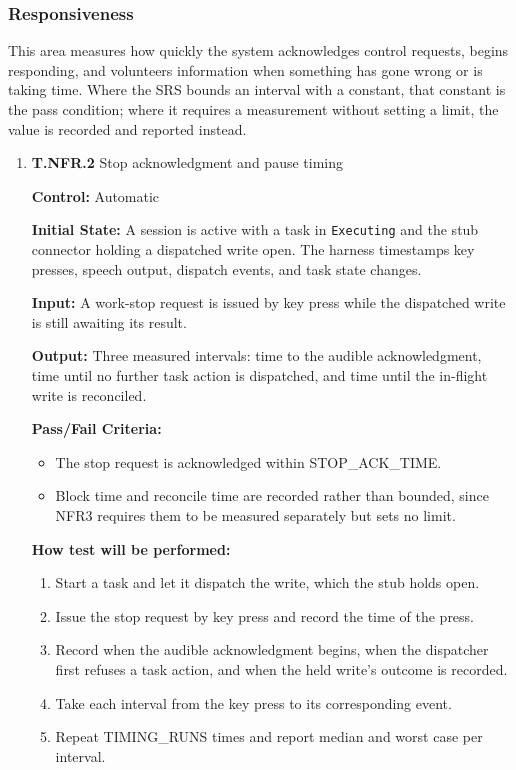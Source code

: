 \documentclass[12pt, titlepage]{article}
\begin{document}
\subsubsection{Responsiveness}

This area measures how quickly the system acknowledges control requests, begins responding, and volunteers
information when something has gone wrong or is taking time. Where the SRS bounds
an interval with a constant, that constant is the pass condition; where it requires a measurement without setting
a limit, the value is recorded and reported instead.

\begin{enumerate}


\item{\textbf{T.NFR.2} Stop acknowledgment and pause timing\\}\label{test:T.NFR.2}

\textbf{Control:} Automatic

\textbf{Initial State:} A session is active with a task in \texttt{Executing} and the stub connector holding a
dispatched write open. The harness timestamps key presses, speech output, dispatch events, and task state changes.

\textbf{Input:} A work-stop request is issued by key press while the dispatched write is still awaiting its result.

\textbf{Output:} Three measured intervals: time to the audible acknowledgment, time until no further
task action is dispatched, and time until the in-flight write is reconciled.

\textbf{Pass/Fail Criteria:}
\begin{itemize}
  \item The stop request is acknowledged within STOP\_ACK\_TIME.
  \item Block time and reconcile time are recorded rather than bounded, since NFR3 requires them to be measured separately but sets no limit.
\end{itemize}

\textbf{How test will be performed:}

\begin{enumerate}
  \item Start a task and let it dispatch the write, which the stub holds open.
  \item Issue the stop request by key press and record the time of the press.
  \item Record when the audible acknowledgment begins, when the dispatcher first refuses a task action, and when the held write's outcome is recorded.
  \item Take each interval from the key press to its corresponding event.
  \item Repeat TIMING\_RUNS times and report median and worst case per interval.
\end{enumerate}


\end{enumerate}
\end{document}
